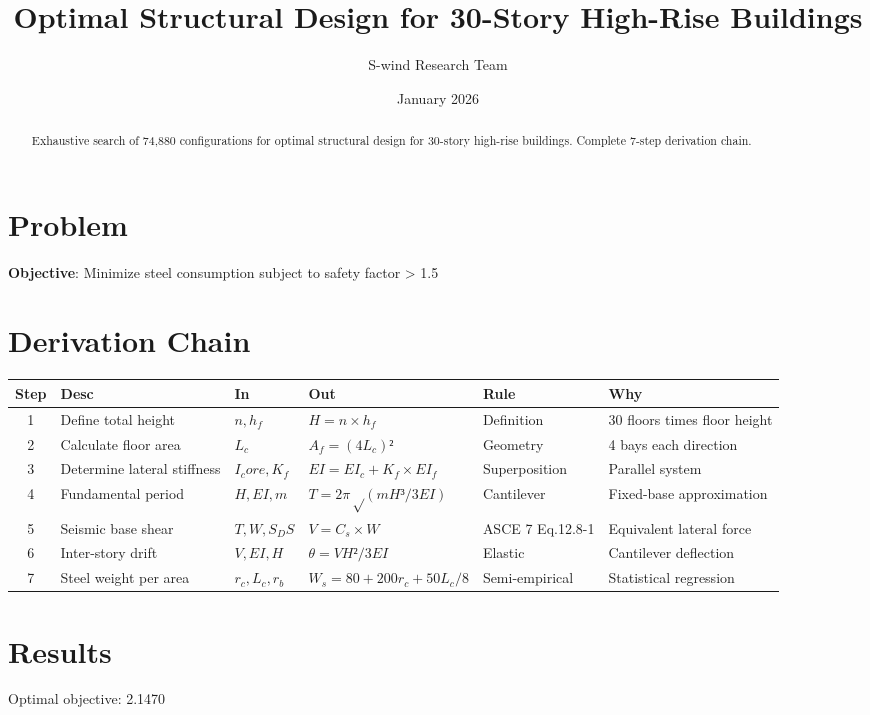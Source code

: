 \documentclass[11pt]{article}
\title{Optimal Structural Design for 30-Story High-Rise Buildings}
\author{S-wind Research Team}
\date{January 2026}
\begin{document}
\maketitle

\begin{abstract}
Exhaustive search of 74,880 configurations for optimal structural design for 30-story high-rise buildings. Complete 7-step derivation chain.
\end{abstract}

\section{Problem}
\textbf{Objective}: Minimize steel consumption subject to safety factor > 1.5

\section{Derivation Chain}
\begin{longtable}{|c|p{2cm}|p{2cm}|p{3cm}|p{2cm}|p{3cm}|}
\hline
Step & Desc & In & Out & Rule & Why\\\hline\endhead
1 & Define total height & $n, h_f$ & $H = n × h_f$ & Definition & 30 floors times floor height\\\hline
2 & Calculate floor area & $L_c$ & $A_f = (4L_c)²$ & Geometry & 4 bays each direction\\\hline
3 & Determine lateral stiffness & $I_core, K_f$ & $EI = EI_c + K_f×EI_f$ & Superposition & Parallel system\\\hline
4 & Fundamental period & $H, EI, m$ & $T = 2π√(mH³/3EI)$ & Cantilever & Fixed-base approximation\\\hline
5 & Seismic base shear & $T, W, S_DS$ & $V = C_s × W$ & ASCE 7 Eq.12.8-1 & Equivalent lateral force\\\hline
6 & Inter-story drift & $V, EI, H$ & $θ = VH²/3EI$ & Elastic & Cantilever deflection\\\hline
7 & Steel weight per area & $r_c, L_c, r_b$ & $W_s = 80+200r_c+50L_c/8$ & Semi-empirical & Statistical regression\\\hline
\end{longtable}

\section{Results}
Optimal objective: 2.1470
\end{document}
